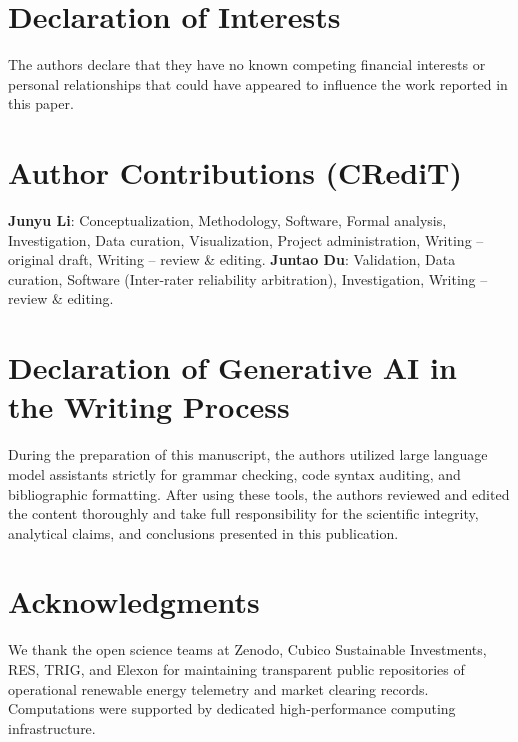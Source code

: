 \documentclass[3p,twocolumn,times]{elsarticle}
\theoremstyle{definition}
\theoremstyle{remark}
\begin{document}












\appendix


\section*{Declaration of Interests}
The authors declare that they have no known competing financial interests or personal relationships that could have appeared to influence the work reported in this paper.

\section*{Author Contributions (CRediT)}
\textbf{Junyu Li}: Conceptualization, Methodology, Software, Formal analysis, Investigation, Data curation, Visualization, Project administration, Writing -- original draft, Writing -- review \& editing. \textbf{Juntao Du}: Validation, Data curation, Software (Inter-rater reliability arbitration), Investigation, Writing -- review \& editing.

\section*{Declaration of Generative AI in the Writing Process}
During the preparation of this manuscript, the authors utilized large language model assistants strictly for grammar checking, code syntax auditing, and bibliographic formatting. After using these tools, the authors reviewed and edited the content thoroughly and take full responsibility for the scientific integrity, analytical claims, and conclusions presented in this publication.

\section*{Acknowledgments}
We thank the open science teams at Zenodo, Cubico Sustainable Investments, RES, TRIG, and Elexon for maintaining transparent public repositories of operational renewable energy telemetry and market clearing records. Computations were supported by dedicated high-performance computing infrastructure.

\setlength{\bibsep}{2.5pt plus 0.5pt minus 0.5pt}
\small

\end{document}
